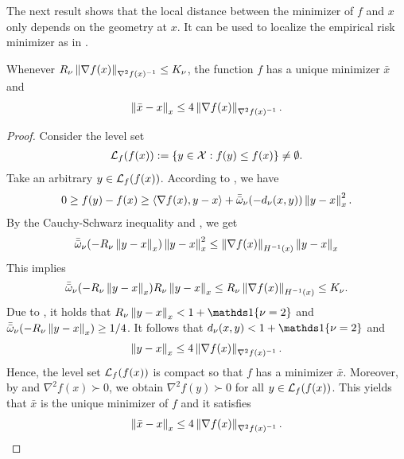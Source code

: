 The next result shows that the local distance between the minimizer of $f$ and $x$ only depends on the geometry at $x$.
It can be used to localize the empirical risk minimizer as in .
\begin{proposition}
\label{prop:self_concordance_local}
    Whenever $R_\nu \left\lVert \nabla f(x) \right\rVert_{\nabla^2 f(x)^{-1}} \le K_\nu$, the function $f$ has a unique minimizer $\bar x$ and
    \begin{align*}
        \left\lVert \bar x - x \right\rVert_x \le 4 \left\lVert \nabla f(x) \right\rVert_{\nabla^2 f(x)^{-1}}.
    \end{align*}
\end{proposition}
\begin{proof}
    Consider the level set
    \begin{align*}
        \mathcal{L}_f(f(x)) := \{y \in \mathcal{X}: f(y) \le f(x)\} \neq \emptyset.
    \end{align*}
    Take an arbitrary $y \in \mathcal{L}_f(f(x))$.
    According to , we have
    \begin{align*}
        0 \ge f(y) - f(x) \ge {\langle \nabla f(x), y - x \rangle} + \bar{\bar{\omega}}_\nu(-d_\nu(x, y)) \left\lVert y-x \right\rVert_x^2.
    \end{align*}
    By the Cauchy-Schwarz inequality and , we get
    \begin{align*}
        \bar{\bar{\omega}}_\nu(-R_\nu \left\lVert y - x \right\rVert_x) \left\lVert y - x \right\rVert_x^2 \le \left\lVert \nabla f(x) \right\rVert_{H^{-1}(x)} \left\lVert y - x \right\rVert_x
    \end{align*}
    This implies
    \begin{align*}
        \bar{\bar{\omega}}_\nu(-R_\nu \left\lVert y - x \right\rVert_x) R_\nu \left\lVert y - x \right\rVert_x \le R_\nu \left\lVert \nabla f(x) \right\rVert_{H^{-1}(x)} \le K_\nu.
    \end{align*}
    Due to , it holds that $R_\nu \norm{y - x}_x < 1 + \ind\{\nu = 2\}$ and $\bar{\bar{\omega}}_\nu(-R_\nu \left\lVert y - x \right\rVert_x) \ge 1/4$.
    It follows that $d_\nu(x, y) < 1 + \ind\{\nu = 2\}$ and
    \begin{align*}
        \left\lVert y - x \right\rVert_x \le 4 \left\lVert \nabla f(x) \right\rVert_{\nabla^2 f(x)^{-1}}.
    \end{align*}
    Hence, the level set $\mathcal{L}_f(f(x))$ is compact so that $f$ has a minimizer $\bar x$.
    Moreover, by  and $\nabla^2 f(x) \succ 0$, we obtain $\nabla^2 f(y) \succ 0$ for all $y \in \mathcal{L}_f(f(x))$.
    This yields that $\bar x$ is the unique minimizer of $f$ and it satisfies
    \begin{align*}
        \left\lVert \bar x - x \right\rVert_x \le 4 \left\lVert \nabla f(x) \right\rVert_{\nabla^2 f(x)^{-1}}.
    \end{align*}
\end{proof}

